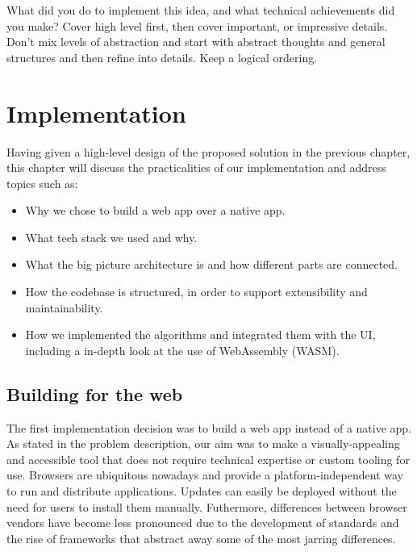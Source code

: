 \documentclass{l4proj}
\begin{document}
What did you do to implement this idea, and what technical achievements did you make?
Cover high level first, then cover important, or impressive details.
Don't mix levels of abstraction and start with abstract thoughts and general structures and then refine into details.
Keep a logical ordering.

\chapter{Implementation}
Having given a high-level design of the proposed solution in the previous chapter, this chapter will discuss the practicalities of our implementation and address topics such as:
\begin{itemize}
      \item Why we chose to build a web app over a native app.
      \item What tech stack we used and why.
      \item What the big picture architecture is and how different parts are connected.
      \item How the codebase is structured, in order to support extensibility and maintainability.
      \item How we implemented the algorithms and integrated them with the UI, including a in-depth look at the use of WebAssembly (WASM).
\end{itemize}

\section{Building for the web}
The first implementation decision was to build a web app instead of a native app. As stated in the problem description, our aim was to make a visually-appealing and accessible tool that does not require technical expertise or custom tooling for use. Browsers are ubiquitous nowadays and provide a platform-independent way to run and distribute applications. Updates can easily be deployed without the need for users to install them manually.
Futhermore, differences between browser vendors have become less pronounced due to the development of standards and the rise of frameworks that abstract away some of the most jarring differences.

\end{document}
